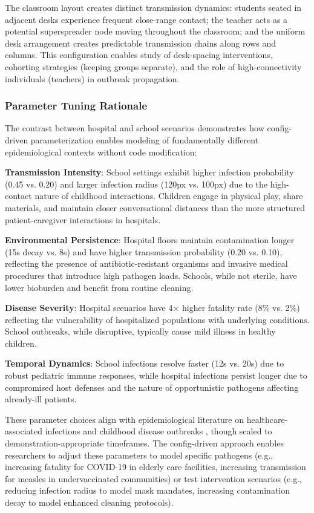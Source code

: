 The classroom layout creates distinct transmission dynamics: students seated in adjacent desks experience frequent close-range contact; the teacher acts as a potential superspreader node moving throughout the classroom; and the uniform desk arrangement creates predictable transmission chains along rows and columns. This configuration enables study of desk-spacing interventions, cohorting strategies (keeping groups separate), and the role of high-connectivity individuals (teachers) in outbreak propagation.

\subsubsection{Parameter Tuning Rationale}
\label{sec:parameter-rationale}

The contrast between hospital and school scenarios demonstrates how config-driven parameterization enables modeling of fundamentally different epidemiological contexts without code modification:

\textbf{Transmission Intensity}: School settings exhibit higher infection probability (0.45 vs. 0.20) and larger infection radius (120px vs. 100px) due to the high-contact nature of childhood interactions. Children engage in physical play, share materials, and maintain closer conversational distances than the more structured patient-caregiver interactions in hospitals.

\textbf{Environmental Persistence}: Hospital floors maintain contamination longer (15s decay vs. 8s) and have higher transmission probability (0.20 vs. 0.10), reflecting the presence of antibiotic-resistant organisms and invasive medical procedures that introduce high pathogen loads. Schools, while not sterile, have lower bioburden and benefit from routine cleaning.

\textbf{Disease Severity}: Hospital scenarios have 4$\times$ higher fatality rate (8\% vs. 2\%) reflecting the vulnerability of hospitalized populations with underlying conditions. School outbreaks, while disruptive, typically cause mild illness in healthy children.

\textbf{Temporal Dynamics}: School infections resolve faster (12s vs. 20s) due to robust pediatric immune responses, while hospital infections persist longer due to compromised host defenses and the nature of opportunistic pathogens affecting already-ill patients.

These parameter choices align with epidemiological literature on healthcare-associated infections and childhood disease outbreaks \cite{silva2020covid,kerr2021covasim}, though scaled to demonstration-appropriate timeframes. The config-driven approach enables researchers to adjust these parameters to model specific pathogens (e.g., increasing fatality for COVID-19 in elderly care facilities, increasing transmission for measles in undervaccinated communities) or test intervention scenarios (e.g., reducing infection radius to model mask mandates, increasing contamination decay to model enhanced cleaning protocols).
